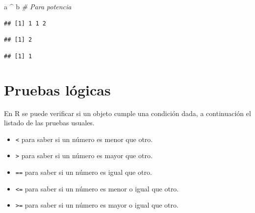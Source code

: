 \documentclass[10pt,]{krantz}
\makeatletter
\newenvironment{Shaded}{\begin{snugshade}}{\end{snugshade}}
\newcommand{\DecValTok}[1]{\textcolor[rgb]{0.00,0.00,0.81}{#1}}
\newcommand{\StringTok}[1]{\textcolor[rgb]{0.31,0.60,0.02}{#1}}
\newcommand{\CommentTok}[1]{\textcolor[rgb]{0.56,0.35,0.01}{\textit{#1}}}
\newcommand{\OperatorTok}[1]{\textcolor[rgb]{0.81,0.36,0.00}{\textbf{#1}}}
\newcommand{\NormalTok}[1]{#1}
\providecommand{\tightlist}{%
  \setlength{\itemsep}{0pt}\setlength{\parskip}{0pt}}
\let\proglang=\textsf
\newenvironment{kframe}{%
\medskip{}
\setlength{\fboxsep}{.8em}
 \def\at@end@of@kframe{}%
 \ifinner\ifhmode%
  \def\at@end@of@kframe{\end{minipage}}%
  \begin{minipage}{\columnwidth}%
 \fi\fi%
 \def\FrameCommand##1{\hskip\@totalleftmargin \hskip-\fboxsep
 \colorbox{shadecolor}{##1}\hskip-\fboxsep
     \hskip-\linewidth \hskip-\@totalleftmargin \hskip\columnwidth}%
 \MakeFramed {\advance\hsize-\width
   \@totalleftmargin\z@ \linewidth\hsize
   \@setminipage}}%
 {\par\unskip\endMakeFramed%
 \at@end@of@kframe}
\renewenvironment{Shaded}{\begin{kframe}}{\end{kframe}}
\makeatother
\begin{document}
\begin{Shaded}
\begin{Highlighting}[]
\NormalTok{a }\OperatorTok{^}\StringTok{ }\NormalTok{b  }\CommentTok{# Para potencia}
\end{Highlighting}
\end{Shaded}

\begin{verbatim}
## [1] 1 1 2
\end{verbatim}

\begin{Shaded}
\end{Shaded}

\begin{verbatim}
## [1] 2
\end{verbatim}

\begin{Shaded}
\end{Shaded}

\begin{verbatim}
## [1] 1
\end{verbatim}

\section{\texorpdfstring{Pruebas lógicas
}{Pruebas lógicas }}\label{pruebas-logicas}

En \proglang{R} se puede verificar si un objeto cumple una condición
dada, a continuación el listado de las pruebas usuales.

\begin{itemize}
\tightlist
\item
  \texttt{\textless{}} para saber si un número es menor que otro.
\item
  \texttt{\textgreater{}} para saber si un número es mayor que otro.
\item
  \texttt{==} para saber si un número es igual que otro.
\item
  \texttt{\textless{}=} para saber si un número es menor o igual que
  otro.
\item
  \texttt{\textgreater{}=} para saber si un número es mayor o igual que
  otro.
\end{itemize}
\end{document}

